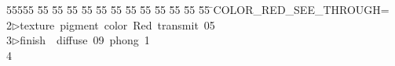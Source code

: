 %
%
\begin{tabbing}
55555 \= 55 \= 55 \= 55 \= 55 \= 55 \= 55 \= 55 \= 55 \= 55 \= 55 \= 55 \= 55 \= \>COLOR\_RED\_SEE\_THROUGH=\\[0pt]
2\>$\triangleright$\>texture\ pigment\ color\ Red\ transmit\ 05\ \ \\[0pt]
3\>$\triangleright$\>finish\ \ diffuse\ 09\ phong\ 1\\[0pt]
4\>\end{tabbing}
